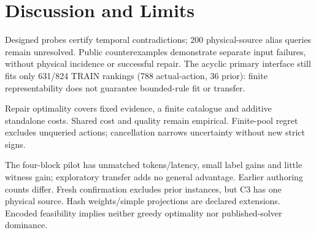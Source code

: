 \section{Discussion and Limits}
\label{sec:discussion}

Designed probes certify temporal contradictions; 200 physical-source alias
queries remain unresolved. Public counterexamples demonstrate separate input
failures, without physical incidence or successful repair. The acyclic
primary interface still fits only 631/824 TRAIN rankings (788 actual-action,
36 prior): finite representability does not guarantee bounded-rule fit or transfer.
\balance

Repair optimality covers fixed evidence, a finite catalogue and additive
standalone costs. Shared cost and quality remain empirical. Finite-pool
regret excludes unqueried actions; cancellation narrows uncertainty without
new strict signs.

The four-block pilot has unmatched tokens/latency, small label gains and
little witness gain; exploratory transfer adds no general advantage.
Earlier authoring counts differ. Fresh confirmation excludes prior instances,
but C3 has one physical source. Hash weights/simple projections are declared
extensions. Encoded feasibility implies neither greedy optimality nor
published-solver dominance.
